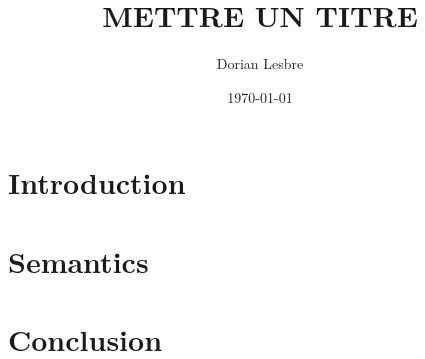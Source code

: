 \documentclass[12pt,a4paper]{article}
\title{METTRE UN TITRE}
\author{Dorian Lesbre}
\date{\today}
\begin{document}
\maketitle

\vfill
{
	\hypersetup{linkcolor=color_fg}
	\tableofcontents
}
\vfill
\newpage

\section{Introduction}



\section{Semantics}

\section{Conclusion}






\end{document}
